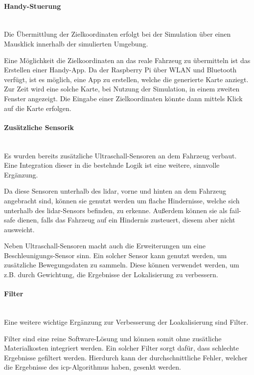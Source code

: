 \paragraph{Handy-Stuerung} \mbox{}\\
Die Übermittlung der Zielkoordinaten erfolgt bei der Simulation über einen Mausklick innerhalb der simulierten Umgebung.

Eine Möglichkeit die Zielkoordinaten an das reale Fahrzeug zu übermitteln ist das Erstellen einer Handy-App.
Da der Raspberry Pi über WLAN und Bluetooth verfügt, ist es möglich, eine App zu erstellen, welche die generierte Karte anziegt.
Zur Zeit wird eine solche Karte, bei Nutzung der Simulation, in einem zweiten Fenster angezeigt.
Die Eingabe einer Zielkoordinaten könnte dann mittels Klick auf die Karte erfolgen.

\paragraph{Zusätzliche Sensorik} \mbox{}\\
Es wurden bereits zusätzliche Ultraschall-Sensoren an dem Fahrzeug verbaut.
Eine Integration dieser in die bestehnde Logik ist eine weitere, sinnvolle Ergänzung.

Da diese Sensoren unterhalb des \ac{lidar}, vorne und hinten an dem Fahrzeug angebracht sind,
können sie genutzt werden um flache Hindernisse, welche sich unterhalb des \ac{lidar}-Sensors befinden, zu erkenne.
Außerdem können sie als fail-safe dienen, falls das Fahrzeug auf ein Hindernis zusteuert, diesem aber nicht ausweicht.

Neben Ultraschall-Sensoren macht auch die Erweiterungen um eine Beschleunigungs-Sensor sinn.
Ein solcher Sensor kann genutzt werden, um zusätzliche Bewegungsdaten zu sammeln.
Diese können verwendet werden, um z.B. durch Gewichtung, die Ergebnisse der Lokalisierung zu verbessern.

\paragraph{Filter} \mbox{}\\
Eine weitere wichtige Ergänzung zur Verbesserung der Loakalisierung sind Filter.

Filter sind eine reine Software-Lösung und können somit ohne zusätliche Materialkosten integriert werden.
Ein solcher Filter sorgt dafür, dass schlechte Ergebnisse gefiltert werden.
Hierdurch kann der durchschnittliche Fehler, welcher die Ergebnisse des \ac{icp}-Algorithmus haben, gesenkt werden.

\newpage
